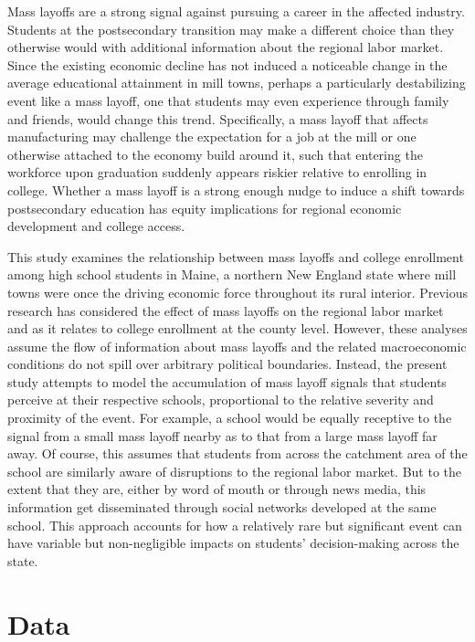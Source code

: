 \documentclass[12pt,letterpaper]{article}
\begin{document}
Mass layoffs are a strong signal against pursuing a career in the affected industry. Students at the postsecondary transition may make a different choice than they otherwise would with additional information about the regional labor market. Since the existing economic decline has not induced a noticeable change in the average educational attainment in mill towns, perhaps a particularly destabilizing event like a mass layoff, one that students may even experience through family and friends, would change this trend. Specifically, a mass layoff that affects manufacturing may challenge the expectation for a job at the mill or one otherwise attached to the economy build around it, such that entering the workforce upon graduation suddenly appears riskier relative to enrolling in college. Whether a mass layoff is a strong enough nudge to induce a shift towards postsecondary education has equity implications for regional economic development and college access.

This study examines the relationship between mass layoffs and college enrollment among high school students in Maine, a northern New England state where mill towns were once the driving economic force throughout its rural interior. Previous research has considered the effect of mass layoffs on the regional labor market \cite{foote:2019} and as it relates to college enrollment \cite{acton:2021,foote-grosz:2020} at the county level. However, these analyses assume the flow of information about mass layoffs and the related macroeconomic conditions do not spill over arbitrary political boundaries. Instead, the present study attempts to model the accumulation of mass layoff signals that students perceive at their respective schools, proportional to the relative severity and proximity of the event. For example, a school would be equally receptive to the signal from a small mass layoff nearby as to that from a large mass layoff far away. Of course, this assumes that students from across the catchment area of the school are similarly aware of disruptions to the regional labor market. But to the extent that they are, either by word of mouth or through news media, this information get disseminated through social networks developed at the same school. This approach accounts for how a relatively rare but significant event can have variable but non-negligible impacts on students' decision-making across the state.

\section{Data}
\end{document}
